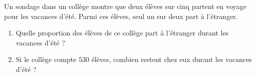 
\begin{exercice}\label{exo2smath-0095}

    Un sondage dans un collège montre que deux élèves sur cinq partent en voyage pour les vacances d'été. Parmi ces élèves, seul un sur deux part à l'étranger.
    \begin{enumerate}
        \item
    Quelle proportion des élèves de ce collège part à l'étranger durant les vacances d'été ?
\item
    Si le collège compte \( 530\) élèves, combien restent chez eux durant les vacances d'été ?
    \end{enumerate}

\end{exercice}
